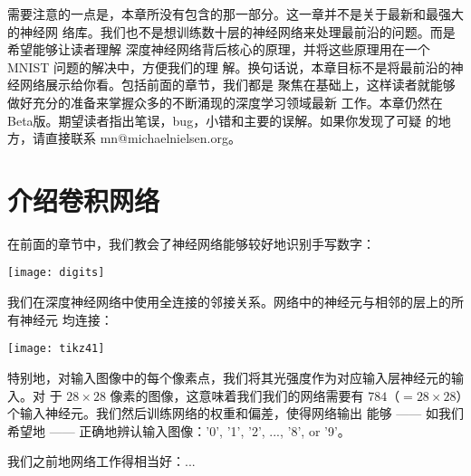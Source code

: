 需要注意的一点是，本章所没有包含的那一部分。这一章并不是关于最新和最强大的神经网
络库。我们也不是想训练数十层的神经网络来处理最前沿的问题。而是希望能够让读者理解
深度神经网络背后核心的原理，并将这些原理用在一个 MNIST 问题的解决中，方便我们的理
解。换句话说，本章目标不是将最前沿的神经网络展示给你看。包括前面的章节，我们都是
聚焦在基础上，这样读者就能够做好充分的准备来掌握众多的不断涌现的深度学习领域最新
工作。本章仍然在Beta版。期望读者指出笔误，bug，小错和主要的误解。如果你发现了可疑
的地方，请直接联系 mn@michaelnielsen.org。

\section{介绍卷积网络}
\label{sec:convolutional_networks}

在前面的章节中，我们教会了神经网络能够较好地识别手写数字：
\begin{center}
  \texttt{[image: digits]}
\end{center}

我们在深度神经网络中使用全连接的邻接关系。网络中的神经元与相邻的层上的所有神经元
均连接：
\begin{center}
  \texttt{[image: tikz41]}
\end{center}

特别地，对输入图像中的每个像素点，我们将其光强度作为对应输入层神经元的输入。对
于 $28 \times 28$ 像素的图像，这意味着我们我们的网络需要有
$784$（$= 28 \times 28$）个输入神经元。我们然后训练网络的权重和偏差，使得网络输出
能够 —— 如我们希望地 —— 正确地辨认输入图像：'0', '1', '2', ..., '8', or '9'。

我们之前地网络工作得相当好：...

